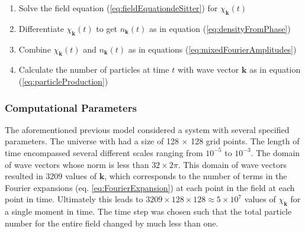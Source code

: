 \documentclass{article}
\begin{document}
            \begin{enumerate}
                \item Solve the field equation (\ref{eq:fieldEquationdeSitter}) for $\chi_\mathbf{k}(t)$
                \item Differentiate $\chi_\mathbf{k}(t)$ to get $n_\mathbf{k}(t)$ as in equation (\ref{eq:densityFromPhase})
                \item Combine $\chi_\mathbf{k}(t)$ and $n_\mathbf{k}(t)$ as in equations (\ref{eq:mixedFourierAmplitudes})
                \item Calculate the number of particles at time $t$ with wave vector $\mathbf{k}$ as in equation (\ref{eq:particleProduction})
            \end{enumerate}

        \subsubsection{Computational Parameters} \label{sec:parameters}

            The aforementioned previous model\cite{Jain} considered a system with several specified parameters.  The universe with had a size of 128 $\times$ 128 grid points. The length of time encompassed several different scales ranging from $10^{-5}$ to $10^{-3}$.  The domain of wave vectors whose norm is less than $32 \times 2 \pi$.  This domain of wave vectors resulted in 3209 values of $\mathbf{k}$, which corresponds to the number of terms in the Fourier expansions (eq. \ref{eq:FourierExpansion}) at each point in the field at each point in time.  Ultimately this leads to $3209 \times 128 \times 128 \approx 5 \times 10^7$ values of $\chi_\mathbf{k}$ for a single moment in time.  The time step was chosen such that the total particle number for the entire field changed by much less than one.
\end{document}
